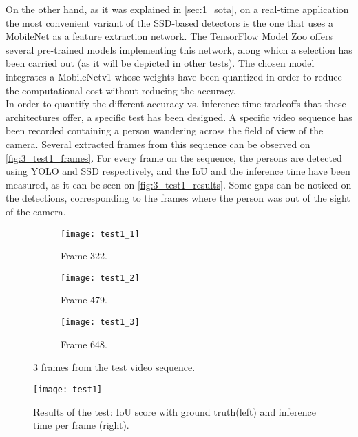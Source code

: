 On the other hand, as it was explained in \autoref{sec:1_sota}, on a real-time application the most convenient variant of the SSD-based detectors is the one that uses a MobileNet \cite{mobilenet} as a feature extraction network. The TensorFlow Model Zoo \cite{model_zoo} offers several pre-trained models implementing this network, along which a selection has been carried out (as it will be depicted in other tests). The chosen model integrates a MobileNetv1 whose weights have been quantized \cite{ssd_quantization} in order to reduce the computational cost without reducing the accuracy.\\


In order to quantify the different accuracy vs. inference time tradeoffs that these architectures offer, a specific test has been designed. A specific video sequence has been recorded containing a person wandering across the field of view of the camera. Several extracted frames from this sequence can be observed on \autoref{fig:3_test1_frames}. For every frame on the sequence, the persons are detected using YOLO and SSD respectively, and the IoU and the inference time have been measured, as it can be seen on \autoref{fig:3_test1_results}. Some gaps can be noticed on the detections, corresponding to the frames where the person was out of the sight of the camera.

\begin{figure}[h]
	\centering
	\begin{subfigure}[b]{0.3\linewidth}
		\centering
		\texttt{[image: test1\_1]}
		\caption{Frame 322.}
	\end{subfigure}
	\begin{subfigure}[b]{0.3\linewidth}
		\centering
		\texttt{[image: test1\_2]}
		\caption{Frame 479.}
	\end{subfigure}
	\begin{subfigure}[b]{0.3\linewidth}
		\centering
		\texttt{[image: test1\_3]}
		\caption{Frame 648.}
	\end{subfigure}
	\caption{3 frames from the test video sequence.}
	\label{fig:3_test1_frames}
\end{figure}




\begin{figure}[h]
	\centering
	\texttt{[image: test1]}
	\caption{Results of the test: IoU score with ground truth(left) and inference time per frame (right).}
	\label{fig:3_test1_results}
\end{figure}

